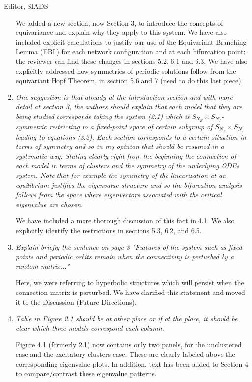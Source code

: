 \documentclass[11pt]{letter}
\begin{document}
\begin{letter}{Editor, SIADS}
\begin{enumerate}
We added a new section, now Section 3, to introduce the concepts of equivariance and explain why they apply to this system. We have also included explicit calculations to justify our use of the Equivariant Branching Lemma (EBL) for each network configuration and at each bifurcation point: the reviewer can find these changes in sections 5.2, 6.1 and 6.3. We have also explicitly addressed how symmetries of periodic solutions follow from the equivariant Hopf Theorem, in section 5.6 and 7 (need to do this last piece)

\item \emph{One suggestion is that already at the introduction section and with more detail at section 3, the authors should explain that each model that they are being studied corresponds taking the system (2.1) which is $S_{N_E} \times S_{N_I}$-symmetric restricting to a fixed-point space of certain subgroup of $S_{N_E} \times S_{N_I}$ leading to equations (3.2). Each section corresponds to a certain situation in terms of symmetry and so in my opinion that should be resumed in a systematic way. Stating clearly right from the beginning the connection of each model in terms of clusters and the symmetry of the underlying ODEs system. Note that for example the symmetry of the linearization at an equilibrium justifies the eigenvalue structure and so the bifurcation analysis follows from the space where eigenvectors associated with the critical eigenvalue are chosen.}
\vspace{4mm}

We have included a more thorough discussion of this fact in 4.1. We also explicitly identify the restrictions in sections 5.3, 6.2, and 6.5.

\item \emph{Explain briefly the sentence on page 3 "Features of the system such as fixed points and periodic orbits remain when the connectivity is perturbed by a random matrix..."}
\vspace{4mm} 

Here, we were referring to hyperbolic structures which will persist when the connection matrix is perturbed. We have clarified this statement and moved it to the Discussion (Future Directions).

\item \emph{Table in Figure 2.1 should be at other place or if at the place, it should be clear which three models correspond each column.}
\vspace{4mm}

Figure 4.1 (formerly 2.1) now contains only two panels, for the unclustered case and the excitatory clusters case. These are clearly labeled above the corresponding eigenvalue plots. In addition, text has been added to Section 4 to compare/contrast these eigenvalue patterns.


\end{enumerate}
\end{letter}
\end{document}
